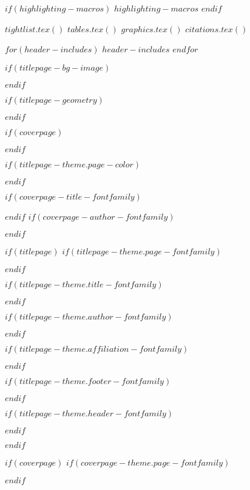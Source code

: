 $if(highlighting-macros)$
$highlighting-macros$
$endif$

$tightlist.tex()$
$tables.tex()$
$graphics.tex()$
$citations.tex()$

$for(header-includes)$
$header-includes$
$endfor$

\usepackage{hyphenat}
\usepackage{ifthen}
\usepackage{calc}
\usepackage{calculator}

$if(titlepage-bg-image)$
\usepackage{graphicx}
\usepackage{wallpaper}
$endif$

$if(titlepage-geometry)$
\usepackage{geometry}
$endif$

$if(coverpage)$
\usepackage{graphicx}
\usepackage{geometry}
\usepackage{afterpage}
\usepackage{tikz}
\usetikzlibrary{calc}
\usetikzlibrary{fadings}
\usepackage[pagecolor=none]{pagecolor}
$endif$

$if(titlepage-theme.page-color)$
\usepackage[pagecolor=none]{pagecolor}
$endif$

$if(coverpage-title-fontfamily)$
\usepackage{fontspec}
$endif$
$if(coverpage-author-fontfamily)$
\usepackage{fontspec}
$endif$

$if(titlepage)$
$if(titlepage-theme.page-fontfamily)$
\usepackage{fontspec}
$endif$

$if(titlepage-theme.title-fontfamily)$
\usepackage{fontspec}
$endif$

$if(titlepage-theme.author-fontfamily)$
\usepackage{fontspec}
$endif$

$if(titlepage-theme.affiliation-fontfamily)$
\usepackage{fontspec}
$endif$

$if(titlepage-theme.footer-fontfamily)$
\usepackage{fontspec}
$endif$

$if(titlepage-theme.header-fontfamily)$
\usepackage{fontspec}
$endif$

$endif$

$if(coverpage)$
$if(coverpage-theme.page-fontfamily)$
\usepackage{fontspec}
$endif$

